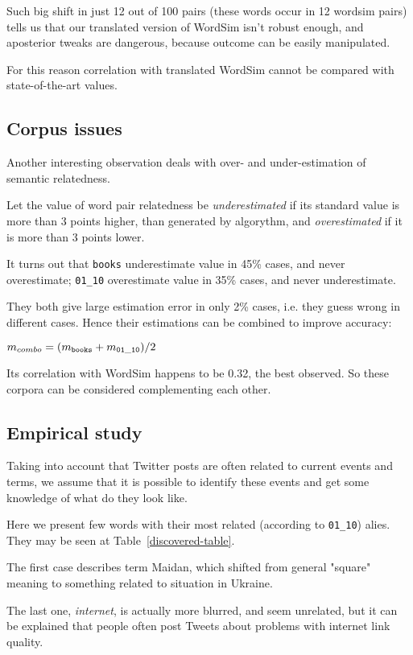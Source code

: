 \documentclass[11pt,letterpaper]{article}
\begin{document}
Such big shift in just 12 out of 100 pairs (these words occur in 12 wordsim pairs) 
tells us that our translated version
of WordSim isn't robust enough, and aposterior tweaks are dangerous, because
outcome can be easily manipulated. 

For this reason correlation with translated WordSim cannot be compared with
state-of-the-art values. 

\subsection{Corpus issues}

Another interesting observation deals with over- and under-estimation of 
semantic relatedness. 

Let the value of word pair relatedness be {\em underestimated} if its standard value is more than 
3 points higher, than generated by algorythm, and {\em overestimated} if it is more than 3 points  
lower.

It turns out that {\tt books} underestimate value in 45\% cases, and never overestimate;
{\tt 01\_10} overestimate value in 35\% cases, and never underestimate. 

They both give large estimation error in only 2\% cases, i.e. they guess wrong in different cases.
Hence their estimations can be combined to improve accuracy:

$m_{combo} = (m_{\tt books} + m_{\tt 01\_10}) / 2 $

Its correlation with WordSim happens to be 0.32, the best observed.
So these corpora can be considered complementing each other.

\subsection{Empirical study}

Taking into account that Twitter posts are often
related to current events and terms, we assume that it is possible to identify
these events and get some knowledge of what do they look like.

Here we present few words with their most related (according to {\tt 01\_10}) alies.
They may be seen at Table~\ref{discovered-table}.

The first case describes term Maidan, which shifted from general "square" meaning
to something related to situation in Ukraine. 

The last one, {\em internet}, is actually more blurred, and seem unrelated, but it can
be explained that people often post Tweets about problems with internet link quality.
\end{document}
